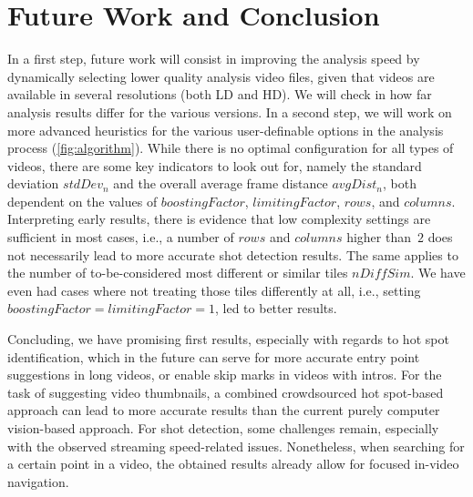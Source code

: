 \documentclass{acm_proc_article-sp}
\begin{document}
\section{Future Work and Conclusion} \label{sec:future-work-conclusion}

In a first step, future work will consist in improving the analysis speed by dynamically selecting lower quality analysis video files, given that videos are available in several resolutions (both LD and HD). We will check in how far analysis results differ for the various versions. In a second step, we will work on more advanced heuristics for the various user-definable options in the analysis process (\autoref{fig:algorithm}). While there is no optimal configuration for all types of videos, there are some key indicators to look out for, namely the standard deviation $\mathit{stdDev_{n}}$ and the overall average frame distance $\mathit{avgDist_{n}}$, both dependent on the values of $\mathit{boostingFactor}$, $\mathit{limitingFactor}$, $\mathit{rows}$, and $\mathit{columns}$. Interpreting early  results, there is evidence that low complexity settings are sufficient in most cases, i.e., a number of $\mathit{rows}$ and $\mathit{columns}$ higher than~$2$ does not necessarily lead to more accurate shot detection results. The same applies to the number of to-be-considered most different or similar tiles $\mathit{nDiffSim}$. We have even had cases where not treating those tiles differently at all, i.e., setting $\mathit{boostingFactor} = \mathit{limitingFactor} = 1$, led to better results.

Concluding, we have promising first results, especially with regards to hot spot identification, which in the future can serve for more accurate entry point suggestions in long videos, or enable skip marks in videos with intros. For the task of suggesting video thumbnails, a combined crowdsourced hot spot-based approach can lead to more accurate results than the current purely computer vision-based approach. For shot detection, some challenges remain, especially with the observed streaming speed-related issues. Nonetheless, when searching for a certain point in a video, the obtained results already allow for focused in-video navigation.
\end{document}
